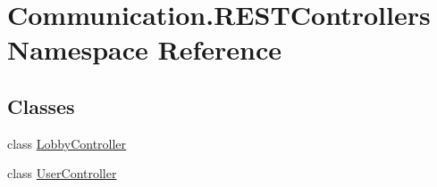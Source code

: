 \hypertarget{namespace_communication_1_1_r_e_s_t_controllers}{}\section{Communication.\+R\+E\+S\+T\+Controllers Namespace Reference}
\label{namespace_communication_1_1_r_e_s_t_controllers}
\subsection*{Classes}
\begin{DoxyCompactItemize}
\item 
class \mbox{\hyperlink{class_communication_1_1_r_e_s_t_controllers_1_1_lobby_controller}{Lobby\+Controller}}
\item 
class \mbox{\hyperlink{class_communication_1_1_r_e_s_t_controllers_1_1_user_controller}{User\+Controller}}
\end{DoxyCompactItemize}
